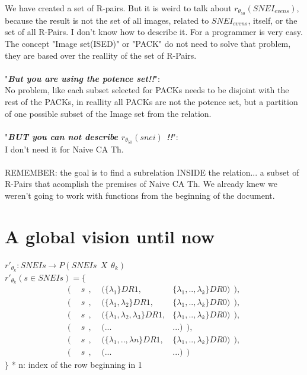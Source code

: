 	\noindent
	We have created a set of R-pairs. But it is weird to talk about $r_{\theta_{50}}(SNEI_{evens})$, because the result is not the set of all images, related to $SNEI_{evens}$, itself, or the set of all R-Pairs. I don't know how to describe it. For a programmer is very easy. The concept "Image set(ISED)" or "PACK" do not need to solve that problem, they are based over the reallity of the set of R-Pairs.
	\\\\
	
	\noindent
	"\textbf{\textit{But you are using the potence set!!}}":\\
	No problem, like each subset selected for PACKs needs to be disjoint with the rest of the PACKs, in reallity all PACKs are not the potence set, but a partition of one possible subset of the Image set from the relation.
	\\\\
	
	\noindent
	"\textbf{\textit{BUT you can not describe $r_{\theta_{50}}(snei)$ !!}}":\\
	I don't need it for Naive CA Th.
	\\\\
	
	\noindent
	REMEMBER: the goal is to find a subrelation INSIDE the relation... a subset of R-Pairs that acomplish the premises of Naive CA Th. We already knew we weren't going to work with functions from the beginning of the document.
	
	\newpage
	\section{A global vision until now}
	
	\noindent
	$r'_{\theta_{k}}: SNEIs \rightarrow P(SNEIs \:\:X\:\: \theta_{k})$ \\
	$r'_{\theta_{k}} ( s \in SNEIs )  = \{$
	\begin{align*}
		(\:\:& s\:\:,   \:\:\:\:\:(\{\lambda_{1}  \}DR1,	                          &\{ \lambda_{1}, .. , \lambda_{k} \}DR0)\:\:), \\
		(\:\:& s\:\:,   \:\:\:\:\:(\{\lambda_{1},\lambda_{2}  \}DR1,	              &\{ \lambda_{1}, .. , \lambda_{k} \}DR0)\:\:), \\
		(\:\:& s\:\:,   \:\:\:\:\:(\{\lambda_{1},\lambda_{2},\lambda_{3}  \}DR1,	  &\{ \lambda_{1}, .. , \lambda_{k} \}DR0)\:\:), \\
		(\:\:& s\:\:,   \:\:\:\:\:(...                                                &... )\:\:),                               \\
		(\:\:& s\:\:,   \:\:\:\:\:(\{\lambda_{1}, .. , \lambda{n}  \}DR1,             &\{ \lambda_{1}, .. , \lambda_{k} \}DR0)\:\:), \\	 
		(\:\:& s\:\:,   \:\:\:\:\:(...                                                &... )\:\:)                                 		  
	\end{align*}
	$\}$ * n: index of the row beginning in 1\\
	\\\\
	
